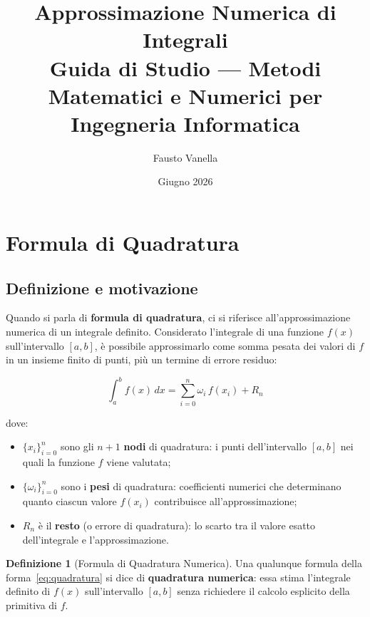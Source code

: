 \documentclass[a4paper,12pt]{article}
\title{\textbf{Approssimazione Numerica di Integrali}\\[0.5em]
\large Guida di Studio ---
Metodi Matematici e Numerici per Ingegneria Informatica}
\author{Fausto Vanella}
\date{Giugno 2026}
\theoremstyle{definition}
\newtheorem{definizione}{Definizione}[section]
\theoremstyle{remark}
\begin{document}
\maketitle
\tableofcontents
\newpage

\section{Formula di Quadratura}

\subsection{Definizione e motivazione}

Quando si parla di \textbf{formula di quadratura}, ci si riferisce
all'approssimazione numerica di un integrale definito.
Considerato l'integrale di una funzione $f(x)$ sull'intervallo $[a,b]$,
è possibile approssimarlo come somma pesata dei valori di $f$ in un insieme
finito di punti, più un termine di errore residuo:

\begin{equation}
  \int_a^b f(x)\,dx = \sum_{i=0}^{n} \omega_i\,f(x_i) + R_n
  \label{eq:quadratura}
\end{equation}

\noindent dove:
\begin{itemize}
  \item $\{x_i\}_{i=0}^{n}$ sono gli $n+1$ \textbf{nodi} di quadratura:
        i punti dell'intervallo $[a,b]$ nei quali la funzione $f$ viene valutata;
  \item $\{\omega_i\}_{i=0}^{n}$ sono i \textbf{pesi} di quadratura:
        coefficienti numerici che determinano quanto ciascun valore $f(x_i)$
        contribuisce all'approssimazione;
  \item $R_n$ è il \textbf{resto} (o errore di quadratura):
        lo scarto tra il valore esatto dell'integrale e l'approssimazione.
\end{itemize}

\begin{definizione}[Formula di Quadratura Numerica]
Una qualunque formula della forma~\eqref{eq:quadratura} si dice di
\textbf{quadratura numerica}: essa stima l'integrale definito di $f(x)$
sull'intervallo $[a,b]$ senza richiedere il calcolo esplicito della
primitiva di $f$.
\end{definizione}
\end{document}
